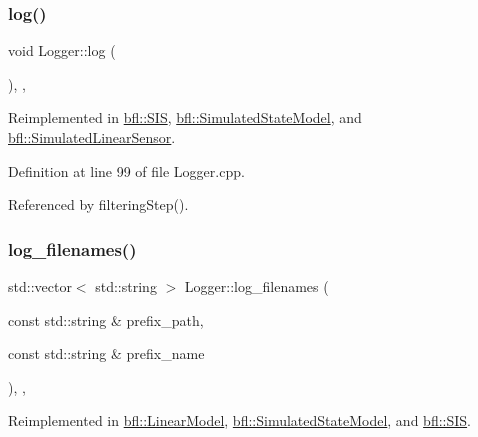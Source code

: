 \subsubsection{\texorpdfstring{log()}{log()}}
{\footnotesize\ttfamily void Logger\+::log (\begin{DoxyParamCaption}{ }\end{DoxyParamCaption})\hspace{0.3cm}{\ttfamily [protected]}, {\ttfamily [virtual]}, {\ttfamily [inherited]}}



Reimplemented in \mbox{\hyperlink{classbfl_1_1SIS_aeb0b87af1cc1fc4b616989ef489ecccc}{bfl\+::\+S\+IS}}, \mbox{\hyperlink{classbfl_1_1SimulatedStateModel_aa022eb0d50d898ffcc831af2907265b2}{bfl\+::\+Simulated\+State\+Model}}, and \mbox{\hyperlink{classbfl_1_1SimulatedLinearSensor_ab75bbe744d8516c97dfc90ad499b10e6}{bfl\+::\+Simulated\+Linear\+Sensor}}.



Definition at line 99 of file Logger.\+cpp.



Referenced by filtering\+Step().

\mbox{\label{classbfl_1_1Logger_a328ceaa8e70e6918f11142b12b8be217}} 
\subsubsection{\texorpdfstring{log\+\_\+filenames()}{log\_filenames()}}
{\footnotesize\ttfamily std\+::vector$<$ std\+::string $>$ Logger\+::log\+\_\+filenames (\begin{DoxyParamCaption}\item[{const std\+::string \&}]{prefix\+\_\+path,  }\item[{const std\+::string \&}]{prefix\+\_\+name }\end{DoxyParamCaption})\hspace{0.3cm}{\ttfamily [protected]}, {\ttfamily [virtual]}, {\ttfamily [inherited]}}



Reimplemented in \mbox{\hyperlink{classbfl_1_1LinearModel_a8b8f645a7b7d8ebbb02c8958428fcf10}{bfl\+::\+Linear\+Model}}, \mbox{\hyperlink{classbfl_1_1SimulatedStateModel_ab4212871b8ca425855ec351c13dc3052}{bfl\+::\+Simulated\+State\+Model}}, and \mbox{\hyperlink{classbfl_1_1SIS_a805aef60946bfcaae4f65473dc7bd5ae}{bfl\+::\+S\+IS}}.



